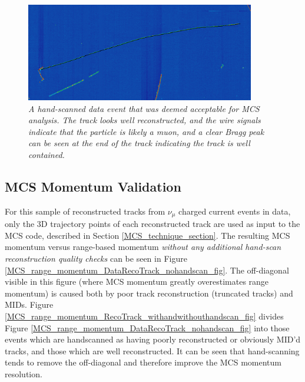 \begin{figure}[ht!]
\begin{center}
\includegraphics[width=100mm]{Figures/good_evd_1.png}
\end{center}
\caption{\textit{A hand-scanned data event that was deemed acceptable for MCS analysis. The track looks well reconstructed, and the wire signals indicate that the particle is likely a muon, and a clear Bragg peak can be seen at the end of the track indicating the track is well contained.}}
\label{good_evd_fig_1}
\end{figure}

\subsection{MCS Momentum Validation}\label{MCS_Momentum_Validation_DataRecoTrack_section}
For this sample of reconstructed tracks from $\nu_\mu$ charged current events in data, only the 3D trajectory points of each reconstructed track are used as input to the MCS code, described in Section \ref{MCS_technique_section}. The resulting MCS momentum versus range-based momentum \textit{without any additional hand-scan reconstruction quality checks} can be seen in Figure \ref{MCS_range_momentum_DataRecoTrack_nohandscan_fig}. The off-diagonal visible in this figure (where MCS momentum greatly overestimates range momentum) is caused both by poor track reconstruction (truncated tracks) and MIDs. Figure \ref{MCS_range_momentum_RecoTrack_withandwithouthandscan_fig} divides Figure \ref{MCS_range_momentum_DataRecoTrack_nohandscan_fig} into those events which are handscanned as having poorly reconstructed or obviously MID'd tracks, and those which are well reconstructed. It can be seen that hand-scanning tends to remove the off-diagonal and therefore improve the MCS momentum resolution.\\

